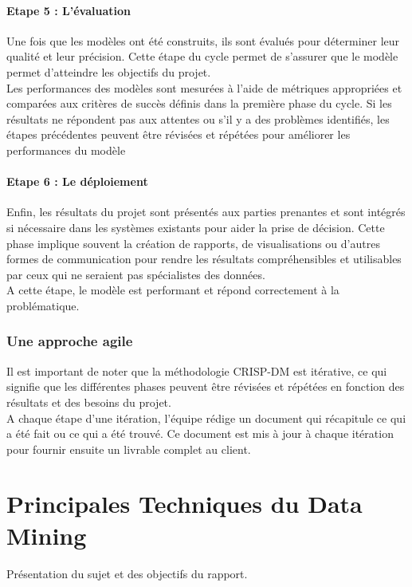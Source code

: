 \documentclass[a4paper,12pt]{report}
\begin{document}
            \subsubsection{Etape 5 : L’évaluation}
            Une fois que les modèles ont été construits, ils sont évalués pour déterminer leur qualité et leur précision. Cette étape du cycle permet de s’assurer que le modèle permet d’atteindre les objectifs du projet. \\
            Les performances des modèles sont mesurées à l'aide de métriques appropriées et comparées aux critères de succès définis dans la première phase du cycle. Si les résultats ne répondent pas aux attentes ou s'il y a des problèmes identifiés, les étapes précédentes peuvent être révisées et répétées pour améliorer les performances du modèle
    
    
            \subsubsection{Etape 6 : Le déploiement}
            Enfin, les résultats du projet sont présentés aux parties prenantes et sont intégrés si nécessaire dans les systèmes existants pour aider la prise de décision. Cette phase implique souvent la création de rapports, de visualisations ou d'autres formes de communication pour rendre les résultats compréhensibles et utilisables par ceux qui ne seraient pas spécialistes des données. \\
            A cette étape, le modèle est performant et répond correctement à la problématique.

        \subsection{Une approche agile }
        Il est important de noter que la méthodologie CRISP-DM est itérative, ce qui signifie que les différentes phases peuvent être révisées et répétées en fonction des résultats et des besoins du projet.\\
        A chaque étape d’une itération, l’équipe rédige un document qui récapitule ce qui a été fait ou ce qui a été trouvé. Ce document est mis à jour à chaque itération pour fournir ensuite un livrable complet au client.

        
\chapter{ Principales Techniques du Data Mining}
Présentation du sujet et des objectifs du rapport.
\end{document}
